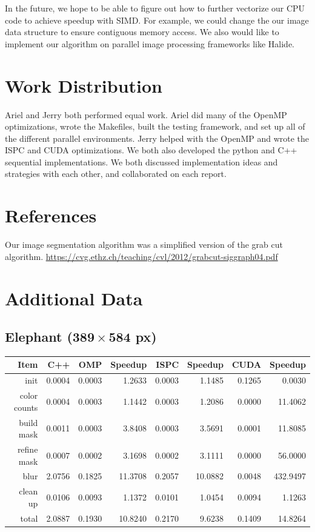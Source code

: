 \documentclass[12pt]{article}
\begin{document}
In the future, we hope to be able to figure out how to further vectorize our
CPU code to achieve speedup with SIMD. For example, we could change the our
image data structure to ensure contiguous memory access. We also would like to
implement our algorithm on parallel image processing frameworks like Halide.

\section{Work Distribution}

Ariel and Jerry both performed equal work. Ariel did many of the OpenMP
optimizations, wrote the Makefiles, built the testing framework, and set up all
of the different parallel environments. Jerry helped with the OpenMP and wrote
the ISPC and CUDA optimizations. We both also developed the python and C++
sequential implementations. We both discussed implementation ideas and
strategies with each other, and collaborated on each report.

\section{References}

Our image segmentation algorithm was a simplified version of the grab cut
algorithm. \url{https://cvg.ethz.ch/teaching/cvl/2012/grabcut-siggraph04.pdf}

\section{Additional Data}

\subsection{Elephant ($\mathbf{389 \times 584}$ px)}

\begin{tabular}{r|r|r|r|r|r|r|r}
    Item & C++ & OMP & Speedup & ISPC & Speedup & CUDA & Speedup
\\  \hline
    init & 0.0004 & 0.0003 & 1.2633 & 0.0003 & 1.1485 & 0.1265 & 0.0030
\\  color counts & 0.0004 & 0.0003 & 1.1442 & 0.0003 & 1.2086 & 0.0000 & 11.4062
\\  build mask & 0.0011 & 0.0003 & 3.8408 & 0.0003 & 3.5691 & 0.0001 & 11.8085
\\  refine mask & 0.0007 & 0.0002 & 3.1698 & 0.0002 & 3.1111 & 0.0000 & 56.0000
\\  blur & 2.0756 & 0.1825 & 11.3708 & 0.2057 & 10.0882 & 0.0048 & 432.9497
\\  clean up & 0.0106 & 0.0093 & 1.1372 & 0.0101 & 1.0454 & 0.0094 & 1.1263
\\  \hline
    total & 2.0887 & 0.1930 & 10.8240 & 0.2170 & 9.6238 & 0.1409 & 14.8264
\end{tabular}
\end{document}
